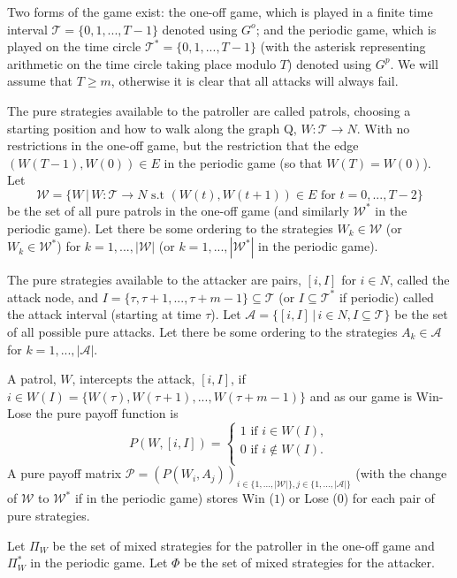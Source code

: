 \documentclass[a4paper,10pt]{article}
\theoremstyle{definition}
\theoremstyle{definition}
\theoremstyle{remark}
\theoremstyle{definition}
\begin{document}
Two forms of the game exist: the one-off game, which is played in a finite time interval $\mathcal{T}=\{0,1,...,T-1\}$ denoted using $G^{o}$; and the periodic game, which is played on the time circle $\mathcal{T}^*=\{0,1,...,T-1\}$ (with the asterisk representing arithmetic on the time circle taking place modulo $T$) denoted using $G^p$. We will assume that $T \geq m$, otherwise it is clear that all attacks will always fail.

The pure strategies available to the patroller are called patrols, choosing a starting position and how to walk along the graph Q, $W:\mathcal{T} \rightarrow N$. With no restrictions in the one-off game, but the restriction that the edge $(W(T-1),W(0)) \in E$ in the periodic game (so that $W(T)=W(0)$). Let $$\mathcal{W}=\{ W \, | \, W:\mathcal{T} \rightarrow N \text{ s.t } (W(t),W(t+1)) \in E \text{ for } t=0,...,T-2  \} $$ be the set of all pure patrols in the one-off game (and similarly $\mathcal{W}^*$ in the periodic game). Let there be some ordering to the strategies $W_{k} \in \mathcal{W}$ (or $W_{k} \in \mathcal{W}^{*}$) for $k=1,...,|\mathcal{W}|$ (or $k=1,...,|\mathcal{W}^*|$ in the periodic game).

The pure strategies available to the attacker are pairs, $[i,I]$ for $i \in N$, called the attack node, and $I=\{ \tau,\tau+1,...,\tau+m-1 \} \subseteq \mathcal{T}$ (or $I \subseteq \mathcal{T}^*$ if periodic) called the attack interval (starting at time $\tau$). Let $\mathcal{A}=\{[i,I] \, | \, i \in N , I \subseteq \mathcal{T} \}$ be the set of all possible pure attacks. Let there be some ordering to the strategies $A_{k} \in \mathcal{A}$ for $k=1,...,|\mathcal{A}|$.

A patrol, $W$, intercepts the attack, $[i,I]$, if $i \in W(I)=\{W(\tau),W(\tau+1),...,W(\tau+m-1)\}$ and as our game is Win-Lose the pure payoff function is
$$P(W,[i,I])=\left\{ \begin{array}{l}
1 \text{  if  } i \in W(I) ,\\
0 \text{  if  } i \notin W(I) .\\
\end{array}\right.$$
A pure payoff matrix $\mathcal{P}=(P(W_{i},A_{j}))_{i \in \{ 1,...,|\mathcal{W}| \}, j \in \{ 1,...,|\mathcal{A}| \}}$ (with the change of $\mathcal{W}$ to $\mathcal{W}^*$ if in the periodic game) stores Win ($1$) or Lose ($0$) for each pair of pure strategies.

Let $\Pi_{W}$ be the set of mixed strategies for the patroller in the one-off game and $\Pi_{W}^*$ in the periodic game. Let $\Phi$ be the set of mixed strategies for the attacker.
\end{document}
